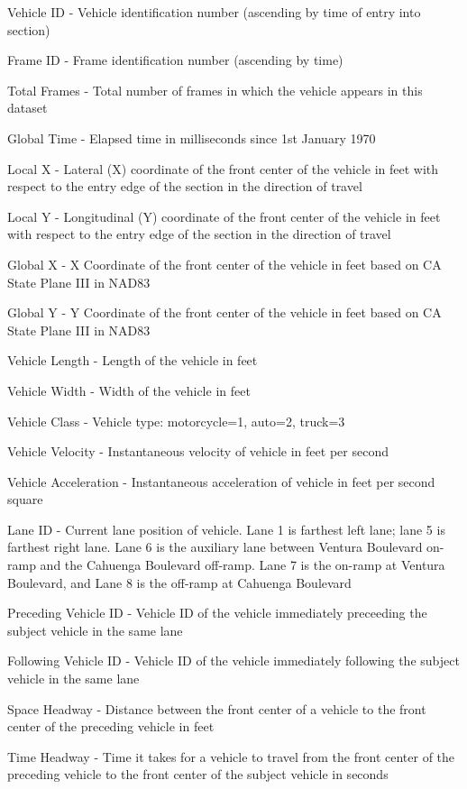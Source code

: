\documentclass[11pt]{uonthesis}
\begin{document}
\begin{description}
    \item Vehicle ID - Vehicle identification number (ascending by time of entry into section)
    \item Frame ID - Frame identification number (ascending by time)
    \item Total Frames - Total number of frames in which the vehicle appears in this dataset
    \item Global Time - Elapsed time in milliseconds since 1st January 1970
    \item Local X - Lateral (X) coordinate of the front center of the vehicle in feet with respect to the entry edge of the section in the direction of travel
    \item Local Y - Longitudinal (Y) coordinate of the front center of the vehicle in feet with respect to the entry edge of the section in the direction of travel
    \item Global X - X Coordinate of the front center of the vehicle in feet based on CA State Plane III in NAD83
    \item Global Y - Y Coordinate of the front center of the vehicle in feet based on CA State Plane III in NAD83
    \item Vehicle Length - Length of the vehicle in feet
    \item Vehicle Width - Width of the vehicle in feet
    \item Vehicle Class - Vehicle type: motorcycle=1, auto=2, truck=3
    \item Vehicle Velocity - Instantaneous velocity of vehicle in feet per second
    \item Vehicle Acceleration - Instantaneous acceleration of vehicle in feet per second square
    \item Lane ID - Current lane position of vehicle. Lane 1 is farthest left lane; lane 5 is farthest right lane. Lane 6 is the auxiliary lane between Ventura Boulevard on-ramp and the Cahuenga Boulevard off-ramp. Lane 7 is the on-ramp at Ventura Boulevard, and Lane 8 is the off-ramp at Cahuenga Boulevard
    \item Preceding Vehicle ID - Vehicle ID of the vehicle immediately preceeding the subject vehicle in the same lane
    \item Following Vehicle ID - Vehicle ID of the vehicle immediately following the subject vehicle in the same lane
    \item Space Headway - Distance between the front center of a vehicle to the front center of the preceding vehicle in feet
    \item Time Headway - Time it takes for a vehicle to travel from the front center of the preceding vehicle to the front center of the subject vehicle in seconds
\end{description}
\end{document}
